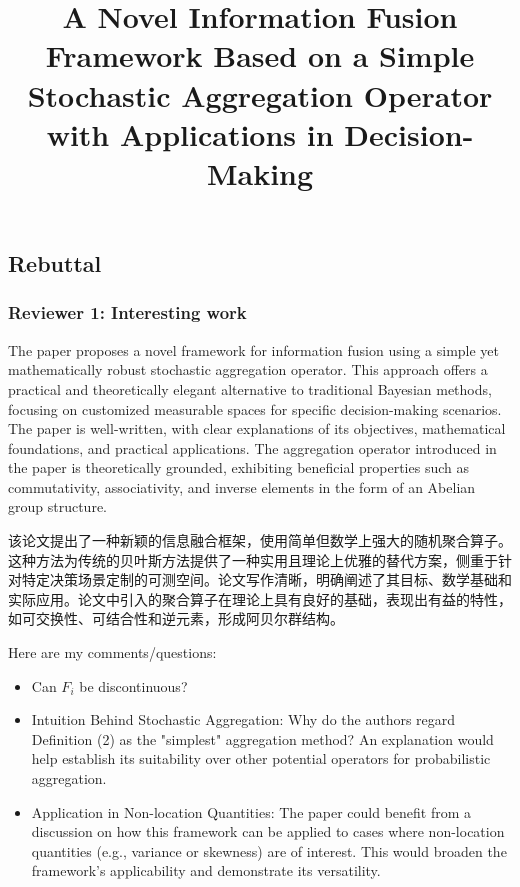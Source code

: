 \documentclass[letterpaper]{article} %
\title{A Novel Information Fusion Framework Based on a Simple Stochastic Aggregation Operator with Applications in Decision-Making}
\begin{document}
\begin{CJK*}{UTF8}{gbsn}  %

\maketitle
\onecolumn


\section{Rebuttal}

\subsubsection{Reviewer 1: Interesting work}


The paper proposes a novel framework for information fusion using a simple yet mathematically robust stochastic aggregation operator. This approach offers a practical and theoretically elegant alternative to traditional Bayesian methods, focusing on customized measurable spaces for specific decision-making scenarios. The paper is well-written, with clear explanations of its objectives, mathematical foundations, and practical applications. The aggregation operator introduced in the paper is theoretically grounded, exhibiting beneficial properties such as commutativity, associativity, and inverse elements in the form of an Abelian group structure.

该论文提出了一种新颖的信息融合框架，使用简单但数学上强大的随机聚合算子。这种方法为传统的贝叶斯方法提供了一种实用且理论上优雅的替代方案，侧重于针对特定决策场景定制的可测空间。论文写作清晰，明确阐述了其目标、数学基础和实际应用。论文中引入的聚合算子在理论上具有良好的基础，表现出有益的特性，如可交换性、可结合性和逆元素，形成阿贝尔群结构。

Here are my comments/questions:

\begin{itemize}
\item Can $F_i$ be discontinuous?

\item Intuition Behind Stochastic Aggregation: Why do the authors regard Definition (2) as the "simplest" aggregation method? An explanation would help establish its suitability over other potential operators for probabilistic aggregation.

\item  Application in Non-location Quantities: The paper could benefit from a discussion on how this framework can be applied to cases where non-location quantities (e.g., variance or skewness) are of interest. This would broaden the framework's applicability and demonstrate its versatility.


\end{itemize}
\end{CJK*}
\end{document}
